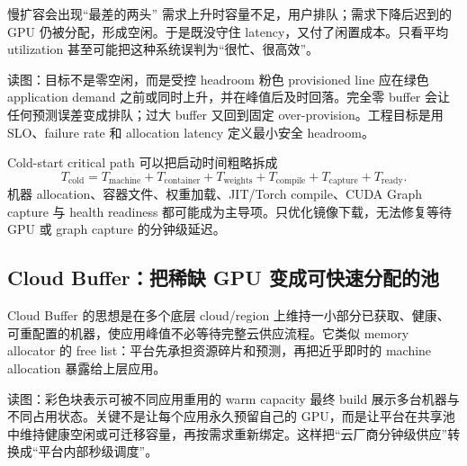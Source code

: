 
\begin{warningbox}{慢扩容会出现“最差的两头”}
需求上升时容量不足，用户排队；需求下降后迟到的 GPU 仍被分配，形成空闲。于是既没守住 latency，又付了闲置成本。只看平均 utilization 甚至可能把这种系统误判为“很忙、很高效”。
\end{warningbox}


\begin{knowledgebox}{读图：目标不是零空闲，而是受控 headroom}
粉色 provisioned line 应在绿色 application demand 之前或同时上升，并在峰值后及时回落。完全零 buffer 会让任何预测误差变成排队；过大 buffer 又回到固定 over-provision。工程目标是用 SLO、failure rate 和 allocation latency 定义最小安全 headroom。
\end{knowledgebox}


\begin{importantbox}{Cold-start critical path}
可以把启动时间粗略拆成
\[
T_{\mathrm{cold}}=T_{\mathrm{machine}}+T_{\mathrm{container}}+T_{\mathrm{weights}}+T_{\mathrm{compile}}+T_{\mathrm{capture}}+T_{\mathrm{ready}}.
\]
机器 allocation、容器文件、权重加载、JIT/Torch compile、CUDA Graph capture 与 health readiness 都可能成为主导项。只优化镜像下载，无法修复等待 GPU 或 graph capture 的分钟级延迟。
\end{importantbox}

\subsection{Cloud Buffer：把稀缺 GPU 变成可快速分配的池}

Cloud Buffer 的思想是在多个底层 cloud/region 上维持一小部分已获取、健康、可重配置的机器，使应用峰值不必等待完整云供应流程。它类似 memory allocator 的 free list：平台先承担资源碎片和预测，再把近乎即时的 machine allocation 暴露给上层应用。


\begin{knowledgebox}{读图：彩色块表示可被不同应用重用的 warm capacity}
最终 build 展示多台机器与不同占用状态。关键不是让每个应用永久预留自己的 GPU，而是让平台在共享池中维持健康空闲或可迁移容量，再按需求重新绑定。这样把“云厂商分钟级供应”转换成“平台内部秒级调度”。
\end{knowledgebox}

